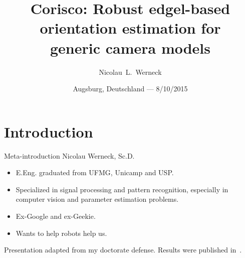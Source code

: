\usepackage{calc}
\usepackage[center]{caption}


\graphicspath{{./figures/}}


\usepackage{setspace}

\renewcommand{\thefootnote}{\fnsymbol{footnote}}



\title[Corisco]{Corisco: Robust edgel-based orientation estimation for\\ generic camera models}

\author[N. Werneck]{Nicolau~L.~Werneck\\
\usebox{\myurl}
}



\date{Augsburg, Deutschland --- 8/10/2015}










\begin{frame}[plain]
  \titlepage
\end{frame}
\addtocounter{framenumber}{-1}




\section[1--Introdução]{Introduction}

\begin{frame}{Meta-introduction}
Nicolau Werneck, Sc.D.
\begin{itemize}
\item E.Eng. graduated from UFMG, Unicamp and USP.
\item Specialized in signal processing and pattern recognition, especially in computer vision and parameter estimation problems.
\item Ex-Google and ex-Geekie.
\item Wants to help robots help us.
\end{itemize}

Presentation adapted from my doctorate defense. Results were published in~\citet{Werneck2013}.

\end{frame}


